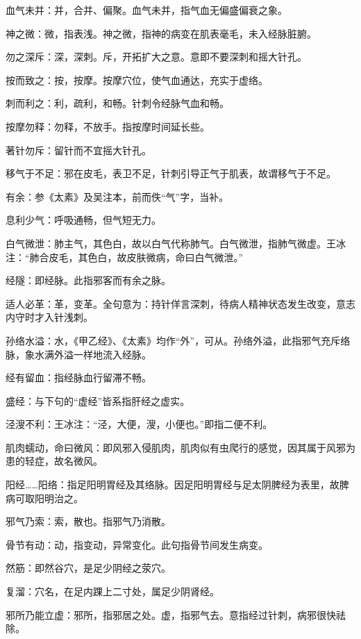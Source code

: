 \documentclass[draft,12pt]{ctexbook}
\begin{document}
\begin{jiaozhu}
	\item 血气未并：并，合并、偏聚。血气未并，指气血无偏盛偏衰之象。
	\item 神之微：微，指表浅。神之微，指神的病变在肌表毫毛，未入经脉脏腑。
	\item 勿之深斥：深，深刺。斥，开拓扩大之意。意即不要深刺和摇大针孔。
	\item 按而致之：按，按摩。按摩穴位，使气血通达，充实于虚络。
	\item 刺而利之：利，疏利，和畅。针刺令经脉气血和畅。
	\item 按摩勿释：勿释，不放手。指按摩时间延长些。
	\item 著针勿斥：留针而不宜摇大针孔。
	\item 移气于不足：邪在皮毛，表卫不足，针刺引导正气于肌表，故谓移气于不足。
	\item 有余：参《太素》及吴注本，前而佚“气”字，当补。
	\item 息利少气：呼吸通畅，但气短无力。
	\item 白气微泄：肺主气，其色白，故以白气代称肺气。白气微泄，指肺气微虚。王冰注：“肺合皮毛，其色白，故皮肤微病，命曰白气微泄。”
	\item 经隧：即经脉。此指邪客而有余之脉。
	\item 适人必革：革，变革。全句意为：持针佯言深刺，待病人精神状态发生改变，意志内守时才入针浅刺。
	\item 孙络水溢：水，《甲乙经》、《太素》均作“外”，可从。孙络外溢，此指邪气充斥络脉，象水满外溢一样地流入经脉。
	\item 经有留血：指经脉血行留滞不畅。
	\item 盛经：与下句的“虚经”皆系指肝经之虚实。
	\item 泾溲不利：王冰注：“泾，大便，溲，小便也。”即指二便不利。
	\item 肌肉蠕动，命曰微风：即风邪入侵肌肉，肌肉似有虫爬行的感觉，因其属于风邪为患的轻症，故名微风。
	\item 阳经……阳络：指足阳明胃经及其络脉。因足阳明胃经与足太阴脾经为表里，故脾病可取阳明治之。
	\item 邪气乃索：索，散也。指邪气乃消散。
	\item 骨节有动：动，指变动，异常变化。此句指骨节间发生病变。
	\item 然筋：即然谷穴，是足少阴经之荥穴。
	\item 复溜：穴名，在足内踝上二寸处，属足少阴肾经。
	\item 邪所乃能立虚：邪所，指邪居之处。虚，指邪气去。意指经过针刺，病邪很快祛除。
\end{jiaozhu}
\end{document}
